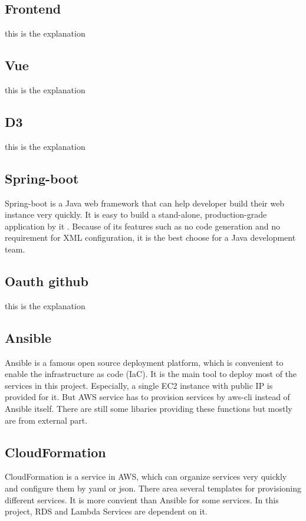 \documentclass[conference]{IEEEtran}
\begin{document}
	
	
	\subsection{Frontend}
	this is the explanation
	
	\subsection{Vue}
	this is the explanation
	
	\subsection{D3}
	this is the explanation
	
	\subsection{Spring-boot}
	Spring-boot is a Java web framework that can help developer build their web instance very quickly. It is easy to build a 
	stand-alone, production-grade application by it \cite{SpringBo66:online}. Because of its features such as no code generation 
	and no requirement for XML configuration, it is the best choose for a Java development team.
	
	\subsection{Oauth github}
	this is the explanation
	
	\subsection{Ansible}
	Ansible is a famous open source deployment platform, which is convenient to enable the infrastructure as code (IaC). 
	It is the main tool to deploy most of the services in this project. Especially, a single EC2 instance with public 
	IP is provided for it. But AWS service has to provision services by aws-cli instead of Ansible itself. There are still 
	some libaries providing these functions but mostly are from external part.
	
	\subsection{CloudFormation}
	CloudFormation is a service in AWS, which can organize services very quickly and configure them by yaml or json. There area
	several templates for provisioning different services. It is more convient than Ansible for some services. In this project, 
	RDS and Lambda Services are dependent on it.
	
\end{document}
